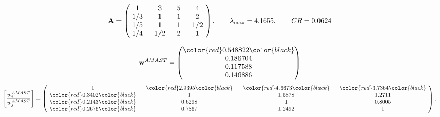 \begin{example}
\begin{equation*}
\mathbf{A} =
\begin{pmatrix}
$\,\,$ 1 $\,\,$ & $\,\,$3$\,\,$ & $\,\,$5$\,\,$ & $\,\,$4 $\,\,$ \\
$\,\,$ 1/3$\,\,$ & $\,\,$ 1 $\,\,$ & $\,\,$1$\,\,$ & $\,\,$2 $\,\,$ \\
$\,\,$ 1/5$\,\,$ & $\,\,$ 1 $\,\,$ & $\,\,$ 1 $\,\,$ & $\,\,$ 1/2 $\,\,$ \\
$\,\,$ 1/4$\,\,$ & $\,\,$ 1/2$\,\,$ & $\,\,$2$\,\,$ & $\,\,$ 1  $\,\,$ \\
\end{pmatrix},
\qquad
\lambda_{\max} =
4.1655,
\qquad
CR = 0.0624
\end{equation*}

\begin{equation*}
\mathbf{w}^{AMAST} =
\begin{pmatrix}
\color{red} 0.548822\color{black} \\
0.186704\\
0.117588\\
0.146886
\end{pmatrix}\end{equation*}
\begin{equation*}
\left[ \frac{{w}^{AMAST}_i}{{w}^{AMAST}_j} \right] =
\begin{pmatrix}
$\,\,$ 1 $\,\,$ & $\,\,$\color{red} 2.9395\color{black} $\,\,$ & $\,\,$\color{red} 4.6673\color{black} $\,\,$ & $\,\,$\color{red} 3.7364\color{black} $\,\,$ \\
$\,\,$\color{red} 0.3402\color{black} $\,\,$ & $\,\,$ 1 $\,\,$ & $\,\,$1.5878$\,\,$ & $\,\,$1.2711  $\,\,$ \\
$\,\,$\color{red} 0.2143\color{black} $\,\,$ & $\,\,$0.6298$\,\,$ & $\,\,$ 1 $\,\,$ & $\,\,$0.8005 $\,\,$ \\
$\,\,$\color{red} 0.2676\color{black} $\,\,$ & $\,\,$0.7867$\,\,$ & $\,\,$1.2492$\,\,$ & $\,\,$ 1  $\,\,$ \\
\end{pmatrix},
\end{equation*}


\end{example}
